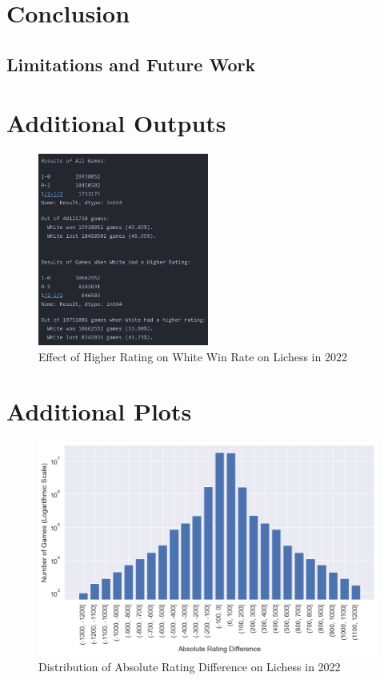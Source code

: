 \documentclass[a4paper, 11pt]{article}
\begin{document}
\section{Conclusion}

\subsection{Limitations and Future Work}




\newpage
\begin{appendices}

\section{Additional Outputs}
\begin{figure}[H]
    \centering
    \caption{Effect of Higher Rating on White Win Rate on Lichess in 2022}
    \label{fig:effectOfHigherRatingOnWhiteWinRate}
    \includegraphics[width=0.5\textwidth]{Effect of Higher Rating on White Win Rate.png}
\end{figure}

\section{Additional Plots}
\begin{figure}[H]
    \centering
    \caption{Distribution of Absolute Rating Difference on Lichess in 2022}
    \label{fig:distributionOfAbsoluteRatingDifference}
    \includegraphics[width=\textwidth]{Distribution of Absolute Rating Difference.png}
\end{figure}


\end{appendices}
\end{document}
